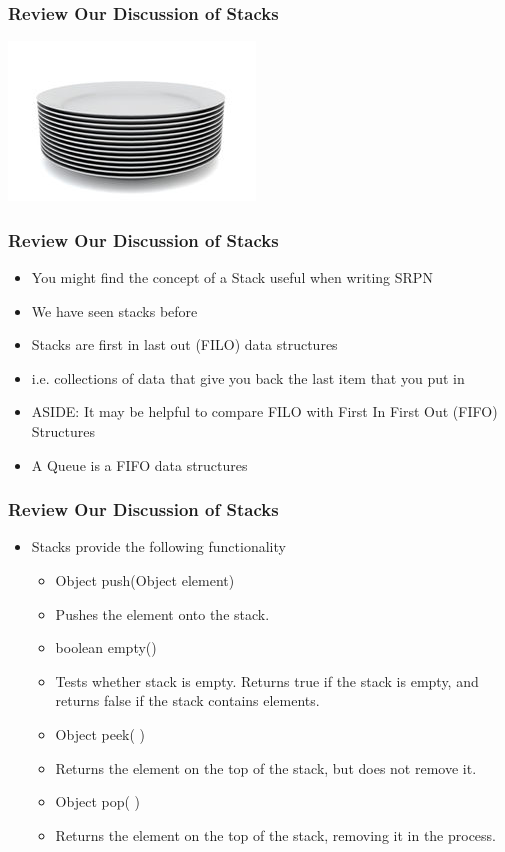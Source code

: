 \documentclass{beamer}
\begin{document}
\begin{frame}
\frametitle{Review Our Discussion of Stacks}
\includegraphics[scale=4.0]{plates.jpg}
\end{frame}

\begin{frame}
\frametitle{Review Our Discussion of Stacks}
\begin{itemize}
\item You might find the concept of a Stack useful when writing SRPN
\item We have seen stacks before
\item Stacks are first in last out (FILO) data structures 
\item i.e. collections of data that give you back the last item that you put in
\bigskip
\item ASIDE: It may be helpful to compare FILO with First In First Out (FIFO) Structures
\item A Queue is a FIFO data structures 
\end{itemize}
\end{frame}

\begin{frame}
\frametitle{Review Our Discussion of Stacks}
\begin{itemize}
\item Stacks provide the following functionality
\bigskip
\begin{itemize}
\item Object push(Object element)
\item Pushes the element onto the stack.
\bigskip
\item boolean empty()
\item Tests whether stack is empty. Returns true if the stack is empty, and returns false if the stack contains elements.
\bigskip
\item Object peek( )
\item Returns the element on the top of the stack, but does not remove it.
\bigskip
\item Object pop( )
\item Returns the element on the top of the stack, removing it in the process.
\bigskip
\end{itemize}
\end{itemize}
\end{frame}
\end{document}
